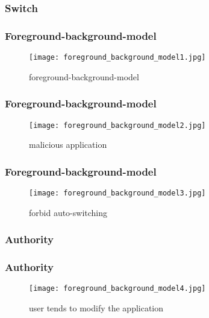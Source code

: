 \documentclass[utf8]{beamer}
\begin{document}
\subsubsection{Switch}
\begin{frame}
\frametitle{Foreground-background-model}
\begin{figure}
\begin{center}
\texttt{[image: foreground\_background\_model1.jpg]}
\end{center}
\caption{foreground-background-model}
\end{figure}
\end{frame}

\begin{frame}
\frametitle{Foreground-background-model}
\begin{figure}
\begin{center}
\texttt{[image: foreground\_background\_model2.jpg]}
\end{center}
\caption{malicious application}
\end{figure}
\end{frame}

\begin{frame}
\frametitle{Foreground-background-model}
\begin{figure}
\begin{center}
\texttt{[image: foreground\_background\_model3.jpg]}
\end{center}
\caption{forbid auto-switching}
\end{figure}
\end{frame}

\subsubsection{Authority}
\begin{frame}
\frametitle{Authority}
\begin{figure}
\begin{center}
\texttt{[image: foreground\_background\_model4.jpg]}
\end{center}
\caption{user tends to modify the application}
\end{figure}
\end{frame}
\end{document}
